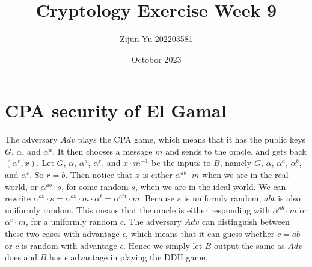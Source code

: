 \documentclass{article}
\title{Cryptology Exercise Week 9}
\author{Zijun Yu 202203581}
\date{Octobor 2023}
\begin{document}
\maketitle

\section*{CPA security of El Gamal}

The adversary $Adv$ plays the CPA game, which means that it has the public keys
$G$, $\alpha$, and $\alpha^a$. It then chooses a message $m$ and sends to the oracle,
and gets back $(\alpha^r, x)$. Let $G$, $\alpha$, $\alpha^a$, $\alpha^r$, and $x\cdot m^{-1}$ be
the inputs to $B$, namely $G$, $\alpha$, $\alpha^a$, $\alpha^b$, and $\alpha^c$. So $r=b$.
Then notice that $x$ is either $\alpha^{ab}\cdot m$ when we are in the real world,
or $\alpha^{ab}\cdot s$, for some random $s$, when we are in the ideal world. We can rewrite
$\alpha^{ab} \cdot s = \alpha^{ab} \cdot m \cdot \alpha^{t} = \alpha^{abt} \cdot m$.
Because $s$ is uniformly random, $abt$ is also uniformly random. This means that the oracle
is either responding with $\alpha^{ab}\cdot m$ or $\alpha^{c}\cdot m$, for a uniformly random $c$.
The adversary $Adv$ can distinguish between these two cases with advantage $\epsilon$, which means
that it can guess whether $c = ab$ or $c$ is random with advantage
$\epsilon$. Hence we simply let $B$ output the same as $Adv$ does and $B$ has $\epsilon$ advantage
in playing the DDH game.
\end{document}
